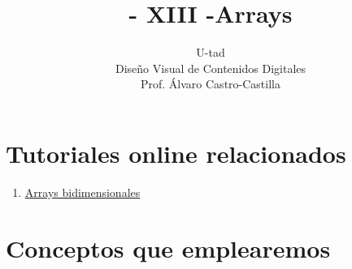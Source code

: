 \documentclass[a4paper,oneside]{article}
\title{- XIII -\linebreak Arrays}
\author{U-tad\\ Diseño Visual de Contenidos Digitales\\ Prof. Álvaro Castro-Castilla}
\date{}
\begin{document}
\maketitle


\section{Tutoriales online relacionados}
\begin{enumerate}
  \item \href{http://processing.org/learning/2darray/}{Arrays bidimensionales} 
\end{enumerate}


\section{Conceptos que emplearemos}
\end{document}
